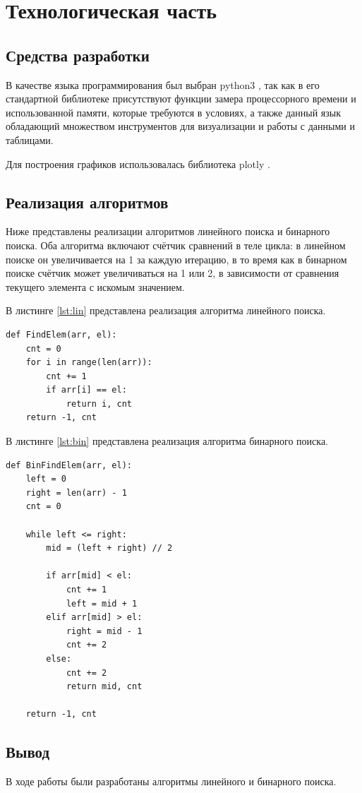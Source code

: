 \chapter{Технологическая часть}

\section{Средства разработки}

В качестве языка программирования был выбран python3 \cite{python3}, так как в его стандартной библиотеке присутствуют функции замера процессорного времени и использованной памяти, которые требуются в условиях, а также данный язык обладающий множеством инструментов для визуализации и работы с данными и таблицами.

Для построения графиков использовалась библиотека plotly \cite{python3-plotly}.

\section{Реализация алгоритмов}

Ниже представлены реализации алгоритмов линейного поиска и бинарного поиска. Оба алгоритма включают счётчик сравнений в теле цикла: в линейном поиске он увеличивается на 1 за каждую итерацию, в то время как в бинарном поиске счётчик может увеличиваться на 1 или 2, в зависимости от сравнения текущего элемента с искомым значением.

В листинге \ref{lst:lin} представлена реализация алгоритма линейного поиска.

\begin{lstlisting}[label=lst:lin,caption={Алгоритм линейного поиска}]
def FindElem(arr, el):
    cnt = 0
    for i in range(len(arr)):
        cnt += 1
        if arr[i] == el:
            return i, cnt
    return -1, cnt
\end{lstlisting}

\clearpage

В листинге \ref{lst:bin} представлена реализация алгоритма бинарного поиска.

\begin{lstlisting}[label=lst:bin,caption={Алгоритм бинарного поиска}]
def BinFindElem(arr, el):
    left = 0
    right = len(arr) - 1
    cnt = 0

    while left <= right:
        mid = (left + right) // 2
        
        if arr[mid] < el:
            cnt += 1
            left = mid + 1
        elif arr[mid] > el:
            right = mid - 1
            cnt += 2
        else:
            cnt += 2
            return mid, cnt

    return -1, cnt
\end{lstlisting}

\section{Вывод}

В ходе работы были разработаны алгоритмы линейного и бинарного поиска.

\clearpage
